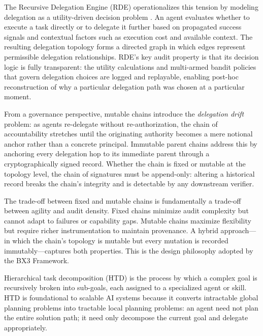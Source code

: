 The Recursive Delegation Engine (RDE) operationalizes this tension by modeling delegation as a utility-driven decision problem \cite{rde2025}. An agent evaluates whether to execute a task directly or to delegate it further based on propagated success signals and contextual factors such as execution cost and available context. The resulting delegation topology forms a directed graph in which edges represent permissible delegation relationships. RDE's key audit property is that its decision logic is fully transparent: the utility calculations and multi-armed bandit policies that govern delegation choices are logged and replayable, enabling post-hoc reconstruction of why a particular delegation path was chosen at a particular moment.

From a governance perspective, mutable chains introduce the \emph{delegation drift} problem: as agents re-delegate without re-authorization, the chain of accountability stretches until the originating authority becomes a mere notional anchor rather than a concrete principal. Immutable parent chains address this by anchoring every delegation hop to its immediate parent through a cryptographically signed record. Whether the chain is fixed or mutable at the topology level, the chain of signatures must be append-only: altering a historical record breaks the chain's integrity and is detectable by any downstream verifier.

The trade-off between fixed and mutable chains is fundamentally a trade-off between agility and audit density. Fixed chains minimize audit complexity but cannot adapt to failures or capability gaps. Mutable chains maximize flexibility but require richer instrumentation to maintain provenance. A hybrid approach---in which the chain's topology is mutable but every mutation is recorded immutably---captures both properties. This is the design philosophy adopted by the BX3 Framework.


Hierarchical task decomposition (HTD) is the process by which a complex goal is recursively broken into sub-goals, each assigned to a specialized agent or skill. HTD is foundational to scalable AI systems because it converts intractable global planning problems into tractable local planning problems: an agent need not plan the entire solution path; it need only decompose the current goal and delegate appropriately.

